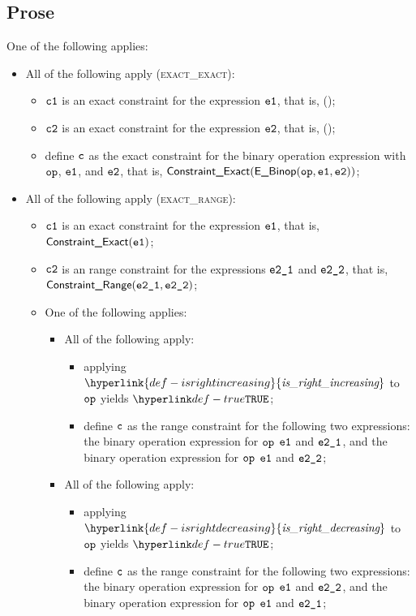 \documentclass{book}
\newcommand\isrightincreasing[0]{\hyperlink{def-isrightincreasing}{\textfunc{is\_right\_increasing}}}
\newcommand\isrightdecreasing[0]{\hyperlink{def-isrightdecreasing}{\textfunc{is\_right\_decreasing}}}
\begin{document}
\subsection{Prose}
One of the following applies:
\begin{itemize}
  \item All of the following apply (\textsc{exact\_exact}):
  \begin{itemize}
    \item $\texttt{c1}$ is an exact constraint for the expression $\texttt{e1}$, that is, \ConstraintExact(\veone);
    \item $\texttt{c2}$ is an exact constraint for the expression $\texttt{e2}$, that is, \ConstraintExact(\vetwo);
    \item define $\texttt{c}$ as the exact constraint for the binary operation expression with $\texttt{op}$, $\texttt{e1}$, and $\texttt{e2}$,
          that is, $\textsf{Constraint\_Exact}(\textsf{E\_Binop}(\texttt{op}, \texttt{e1}, \texttt{e2}))$;
  \end{itemize}

  \item All of the following apply (\textsc{exact\_range}):
  \begin{itemize}
    \item $\texttt{c1}$ is an exact constraint for the expression $\texttt{e1}$, that is, $\textsf{Constraint\_Exact}(\texttt{e1})$;
    \item $\texttt{c2}$ is an range constraint for the expressions $\texttt{e2\_1}$ and $\texttt{e2\_2}$, that is, \\ $\textsf{Constraint\_Range}(\texttt{e2\_1}, \texttt{e2\_2})$;
    \item One of the following applies:
    \begin{itemize}
      \item All of the following apply:
      \begin{itemize}
          \item applying $\isrightincreasing$ to $\texttt{op}$ yields $\True$;
          \item define $\texttt{c}$ as the range constraint for the following two expressions:
          the binary operation expression for $\texttt{op}$ $\texttt{e1}$ and $\texttt{e2\_1}$, and
          the binary operation expression for $\texttt{op}$ $\texttt{e1}$ and $\texttt{e2\_2}$;
      \end{itemize}

      \item All of the following apply:
      \begin{itemize}
          \item applying $\isrightdecreasing$ to $\texttt{op}$ yields $\True$;
          \item define $\texttt{c}$ as the range constraint for the following two expressions:
          the binary operation expression for $\texttt{op}$ $\texttt{e1}$ and $\texttt{e2\_2}$, and
          the binary operation expression for $\texttt{op}$ $\texttt{e1}$ and $\texttt{e2\_1}$;
      \end{itemize}


\end{itemize}
\end{itemize}
\end{itemize}
\end{document}
